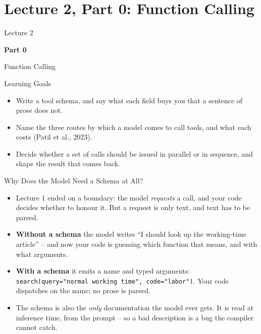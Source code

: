 \section{Lecture 2, Part 0: Function Calling}

\begin{frame}
\vfill
\centering
{\color{RLBlue}\large Lecture 2}

\vspace{0.3em}
{\color{RLBlue}\Large\bfseries Part 0}

\vspace{0.6em}
{\Large Function Calling}
\vfill
\end{frame}

\begin{frame}{Learning Goals}
\begin{itemize}
  \item Write a tool schema, and say what each field buys you that a sentence of prose does not.
  \pause
  \item Name the three routes by which a model comes to call tools, and what each costs (Patil et al., 2023).
  \pause
  \item Decide whether a set of calls should be issued in parallel or in sequence, and shape the result that comes back.
\end{itemize}
\end{frame}

\begin{frame}{Why Does the Model Need a Schema at All?}
\begin{itemize}
  \item Lecture 1 ended on a boundary: the model \emph{requests} a call, and your code decides whether to honour it. But a request is only text, and text has to be parsed.
  \pause
  \item \textbf{Without a schema} the model writes ``I should look up the working-time article'' -- and now your code is guessing which function that means, and with what arguments.
  \pause
  \item \textbf{With a schema} it emits a name and typed arguments: \texttt{search(query="normal working time", code="labor")}. Your code dispatches on the name; no prose is parsed.
  \pause
  \item The schema is also the \emph{only} documentation the model ever gets. It is read at inference time, from the prompt -- so a bad description is a bug the compiler cannot catch.
\end{itemize}
\end{frame}

